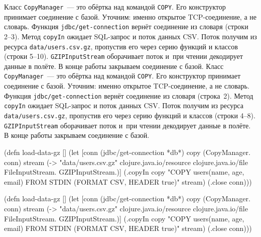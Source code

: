 \ifx\devicetype\mobile
Класс \verb|CopyManager|~--- это обёртка над командой \verb|COPY|. Его конструктор
принимает соединение с базой. Уточним: именно открытое TCP-соединение, а не
словарь. Функция \verb|jdbc/get-connection| вернёт соединение из словаря
(строки 2--3). Метод \verb|copyIn| ожидает SQL-запрос и поток данных CSV. Поток
получим из ресурса \verb|data/users.csv.gz|, пропустив его через серию функций и
классов (строки 5--10). \verb|GZIPInputStream| оборачивает поток и~при чтении
декодирует данные в полёте. В конце работы закрываем соединение с базой.
\else
Класс \verb|CopyManager|~--- это обёртка над командой \verb|COPY|. Его конструктор
принимает соединение с базой. Уточним: именно открытое TCP-соединение, а не
словарь. Функция \verb|jdbc/get-connection| вернёт соединение из словаря
(строка~2). Метод \verb|copyIn| ожидает SQL-запрос и поток данных CSV. Поток
получим из ресурса \verb|data/users.csv.gz|, пропустив его через серию функций и
классов (строки 4--8). \verb|GZIPInputStream| оборачивает поток и~при чтении
декодирует данные в полёте. В конце работы закрываем соединение с базой.
\fi


\ifx\devicetype\mobile

\begin{english}
  \begin{clojure/lines}
(defn load-data-gz []
  (let [conn
        (jdbc/get-connection *db*)
        copy (CopyManager. conn)
        stream
        (-> "data/users.csv.gz"
            clojure.java.io/resource
            clojure.java.io/file
            FileInputStream.
            GZIPInputStream.)]
   (.copyIn copy
     "COPY users(name, age, email)
      FROM STDIN
      (FORMAT CSV, HEADER true)"
     stream)
   (.close conn)))
  \end{clojure/lines}
\end{english}

\else

\begin{english}
  \begin{clojure/lines}
(defn load-data-gz []
  (let [conn (jdbc/get-connection *db*)
        copy (CopyManager. conn)
        stream (-> "data/users.csv.gz"
                   clojure.java.io/resource
                   clojure.java.io/file
                   FileInputStream.
                   GZIPInputStream.)]
    (.copyIn copy "COPY users(name, age, email)
                   FROM STDIN (FORMAT CSV, HEADER true)"
             stream)
    (.close conn)))
  \end{clojure/lines}
\end{english}

